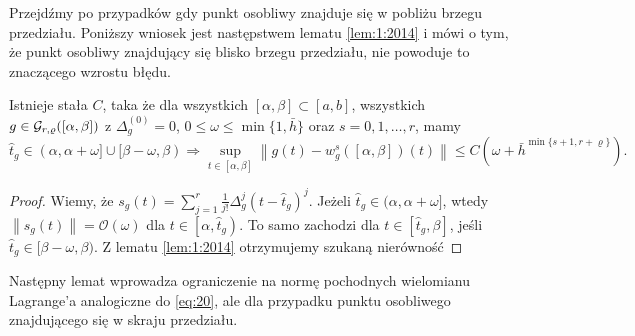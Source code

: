 \documentclass[oik, pdftex, man]{mgrwms}
\begin{document}
    Przejdźmy po przypadków gdy punkt osobliwy znajduje się w pobliżu brzegu przedziału. Poniższy wniosek jest następstwem lematu \ref{lem:1:2014} i mówi o tym, że punkt osobliwy znajdujący się blisko brzegu przedziału, nie powoduje to znaczącego wzrostu błędu.

    \begin{cor} \label{cor:1}
        Istnieje stała $C$, taka że dla wszystkich $[\alpha, \beta] \subset [a, b]$, wszystkich $g \in \mathcal{G}_{r,\varrho}([\alpha,\beta])$ z $\Delta_{g}^{(0)} = 0$, $0 \leq \omega \leq \min \{1, \bar{h}\}$ oraz $s=0,1,\dots,r$, mamy
        \begin{equation*}
            \hat{t}_{g} \in(\alpha, \alpha+\omega] \cup[\beta-\omega, \beta) \Longrightarrow  \sup_{t \in[\alpha, \beta]}\left\|g(t)-w_{g}^{s}([\alpha, \beta])(t)\right\| \leq C\left(\omega+\bar{h}^{\min \{s+1, r+\varrho\}}\right).
        \end{equation*}
    \end{cor}
    \begin{proof}
        Wiemy, że $s_{g}(t)=\sum_{j=1}^{r} \frac{1}{j !} \Delta_{g}^{j}\left(t-\hat{t}_{g}\right)^{j}$. Jeżeli $\hat{t}_{g} \in(\alpha, \alpha+\omega]$, wtedy $\left\|s_{g}(t)\right\|=\mathcal{O}(\omega)$ dla $t \in\left[\alpha, \hat{t}_{g}\right) .$ To samo zachodzi dla $t \in\left[\hat{t}_{g}, \beta\right]$, jeśli $\hat{t}_{g} \in[\beta-\omega, \beta)$. Z lematu \ref{lem:1:2014} otrzymujemy szukaną nierówność
    \end{proof}

    Następny lemat wprowadza ograniczenie na normę pochodnych wielomianu Lagrange'a analogiczne do \eqref{eq:20}, ale dla przypadku punktu osobliwego znajdującego się w skraju przedziału.
\end{document}
